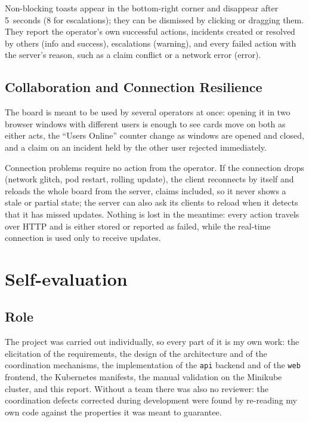 \documentclass{scrartcl}
\begin{document}
Non-blocking toasts appear in the bottom-right corner and disappear after 5~seconds (8 for escalations); they can be dismissed by clicking or dragging them. They report the operator's own successful actions, incidents created or resolved by others (info and success), escalations (warning), and every failed action with the server's reason, such as a claim conflict or a network error (error).

\subsection{Collaboration and Connection Resilience}\label{ug-resilience}

The board is meant to be used by several operators at once: opening it in two browser windows with different users is enough to see cards move on both as either acts, the ``Users Online'' counter change as windows are opened and closed, and a claim on an incident held by the other user rejected immediately.

Connection problems require no action from the operator. If the connection drops (network glitch, pod restart, rolling update), the client reconnects by itself and reloads the whole board from the server, claims included, so it never shows a stale or partial state; the server can also ask its clients to reload when it detects that it has missed updates. Nothing is lost in the meantime: every action travels over HTTP and is either stored or reported as failed, while the real-time connection is used only to receive updates.

\section{Self-evaluation}\label{self-evaluation}

\subsection{Role}

The project was carried out individually, so every part of it is my own work: the elicitation of the requirements, the design of the architecture and of the coordination mechanisms, the implementation of the \texttt{api} backend and of the \texttt{web} frontend, the Kubernetes manifests, the manual validation on the Minikube cluster, and this report. Without a team there was also no reviewer: the coordination defects corrected during development were found by re-reading my own code against the properties it was meant to guarantee.
\end{document}
